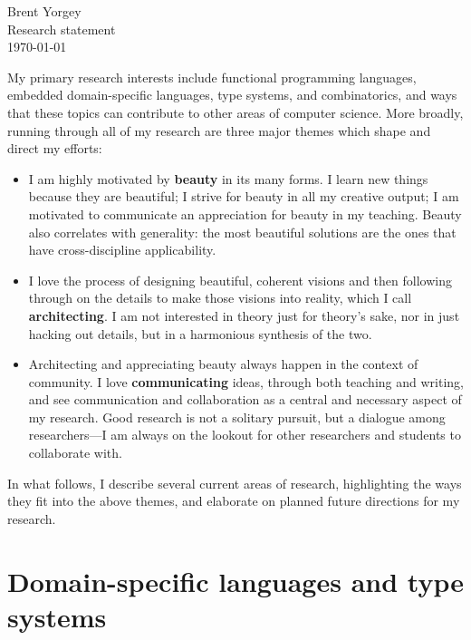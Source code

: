 \documentclass[12pt]{article}
\begin{document}
\noindent Brent Yorgey \\
Research statement \\
\today
\bigskip

My primary research interests include functional programming
languages, embedded domain-specific languages, type systems, and
combinatorics, and ways that these topics can contribute to other
areas of computer science.  More broadly, running through all of my
research are three major themes which shape and direct my efforts:

\begin{itemize}
\item I am highly motivated by \textbf{beauty} in its many forms.  I
  learn new things because they are beautiful; I strive for beauty in
  all my creative output; I am motivated to communicate an
  appreciation for beauty in my teaching.  Beauty also correlates
  with generality: the most beautiful solutions are the ones that have
  cross-discipline applicability.
\item I love the process of designing beautiful, coherent visions and
  then following through on the details to make those visions into
  reality, which I call \textbf{architecting}.  I am not interested in
  theory just for theory's sake, nor in just hacking out details, but
  in a harmonious synthesis of the two.
\item Architecting and appreciating beauty always happen in the
  context of community.  I love \textbf{communicating} ideas, through
  both teaching and writing, and see communication and collaboration
  as a central and necessary aspect of my research. Good research is
  not a solitary pursuit, but a dialogue among researchers---I am
  always on the lookout for other researchers and students to
  collaborate with.
\end{itemize}

In what follows, I describe several current areas of research,
highlighting the ways they fit into the above themes, and elaborate on
planned future directions for my research.


\section*{Domain-specific languages and type systems}
\label{sec:edsls}
\end{document}
